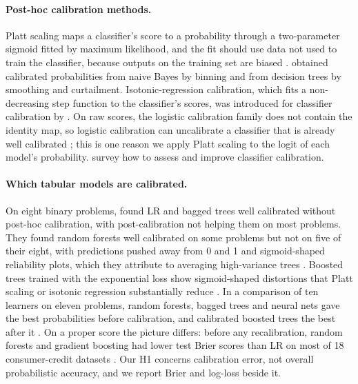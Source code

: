 \documentclass[11pt]{article}
\begin{document}
\paragraph{Post-hoc calibration methods.} Platt scaling maps a classifier's score to a
probability through a two-parameter sigmoid fitted by maximum likelihood, and the fit should
use data not used to train the classifier, because outputs on the training set are biased
\citep{platt1999}. \citet{zadrozny2001} obtained calibrated probabilities from naive Bayes by
binning and from decision trees by smoothing and curtailment. Isotonic-regression calibration,
which fits a non-decreasing step function to the classifier's scores, was introduced for
classifier calibration by \citet{zadrozny2002} \citep[see also][]{niculescumizil2005}. On raw
scores, the logistic calibration family does not contain the identity map, so logistic
calibration can uncalibrate a classifier that is already well calibrated \citep{kull2017};
this is one reason we apply Platt scaling to the logit of each model's probability.
\citet{silvafilho2023} survey how to assess and improve classifier calibration.

\paragraph{Which tabular models are calibrated.} On eight binary problems,
\citet{niculescumizil2005} found LR and bagged trees well calibrated without post-hoc
calibration, with post-calibration not helping them on most problems. They found random
forests well calibrated on some problems but not on five of their eight, with predictions
pushed away from 0 and 1 and sigmoid-shaped reliability plots, which they attribute to
averaging high-variance trees \citep[see also][]{sklearn_calibration_docs}. Boosted trees
trained with the exponential loss show sigmoid-shaped distortions that Platt scaling or
isotonic regression substantially reduce \citep{niculescumizil2005boosting,niculescumizil2005}.
In a comparison of ten learners on eleven problems, random forests, bagged trees and neural
nets gave the best probabilities before calibration, and calibrated boosted trees the best
after it \citep{caruana2006}. On a proper score the picture differs: before any
recalibration, random forests and gradient boosting had lower test Brier scores than LR on
most of 18 consumer-credit datasets \citep{fonseca2017}. Our H1 concerns calibration error,
not overall probabilistic accuracy, and we report Brier and log-loss beside it.
\end{document}
